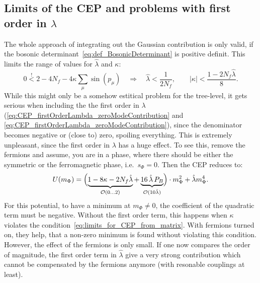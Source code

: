 \subsection*{Limits of the CEP and problems with first order in $\lambda$}
The whole approach of integrating out the Gaussian contribution is only valid, if the bosonic determinant~\eqref{eq:def_BosonicDeterminant}
is positive definit. This limits the range of values for $\hat\lambda$ and $\kappa$:
\begin{equation}\label{eq:limits_for_CEP_from_matrix}
 0 \stackrel{!}{<} 2 - 4 N_f - 4 \kappa \sum\limits_{\mu} \sin(p_{\mu}) \quad \Rightarrow \quad
 \hat\lambda < \frac{1}{2 N_f} ,\qquad
 |\kappa| < \frac{1 - 2 N_f \hat \lambda}{8}.
\end{equation}
While this might only be a somehow estitical problem for the tree-level, it gets serious when including the the first order in 
$\lambda$ (\eqref{eq:CEP_firstOrderLambda_zeroModeContribution} and \eqref{eq:CEP_firstOrderLambda_zeroModeContribution}), since the denominator
becomes negative or (close to) zero, spoiling everything.
This is extremely unpleasant, since the first order in $\lambda$ has a huge effect. To see this, remove the fermions and assume, you are in a phase, where 
there should be either the symmetric or the ferromagnetic phase, i.e.\ $s_{\Phi}=0$. Then the CEP reduces to:
\begin{equation}\label{eq:simple_CEP_reduction}
 U(m_{\Phi}) = \Bigl( \underbrace{1 - 8\kappa - 2 N_f \hat \lambda}_{\mathcal{O}(0\dots 2)} 
             + \underbrace{ 16\, \hat\lambda\, P_B}_{\mathcal{O}(10\hat\lambda)} \Bigr)\cdot m_{\Phi}^2 + \hat \lambda m_{\Phi}^4.
\end{equation}
For this potential, to have a minimum at $m_{\Phi}\neq 0$, the coefficient of the quadratic term must be negative. Without the first order term, this happens 
when $\kappa$ violates the condition~\eqref{eq:limits_for_CEP_from_matrix}. With fermions turned on, they help, that a non-zero minimum 
is found without violating this condition. However, the effect of the fermions is only small. If one now compares the order of magnitude, the first order term in 
$\hat\lambda$ give a very strong contribution which cannot be compensated by the fermions anymore (with resonable couplings at least).


